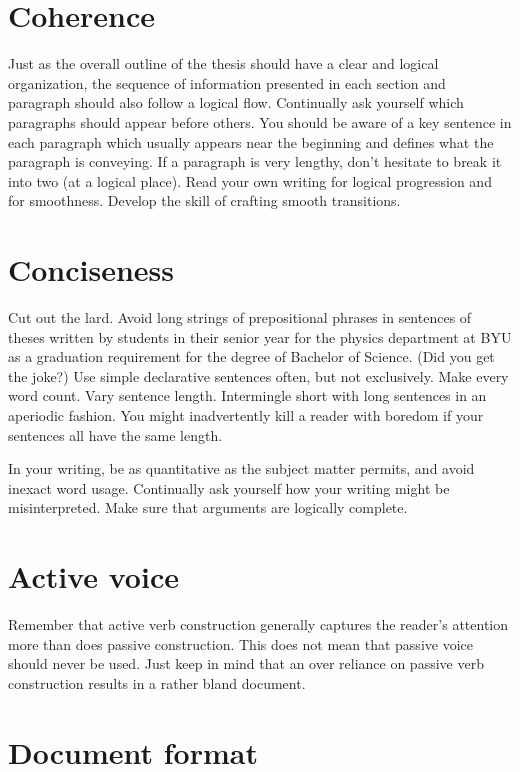 \section{Coherence}
\label{sec:Coherence}

Just as the overall outline of the thesis should have a clear and
logical organization, the sequence of information presented in each
section and paragraph should also follow a logical flow. Continually
ask yourself which paragraphs should appear before others. You
should be aware of a key sentence in each paragraph which usually
appears near the beginning and defines what the paragraph is
conveying. If a paragraph is very lengthy, don't hesitate to break
it into two (at a logical place). Read your own writing for logical
progression and for smoothness. Develop the skill of crafting smooth
transitions.

\section{Conciseness}
\label{sec:Concise}

Cut out the lard. Avoid long strings of prepositional phrases in
sentences of theses written by students in their senior year for the
physics department at BYU as a graduation requirement for the degree
of Bachelor of Science. (Did you get the joke?) Use simple
declarative sentences often, but not exclusively. Make every word
count. Vary sentence length. Intermingle short with long sentences
in an aperiodic fashion. You might inadvertently kill a reader with
boredom if your sentences all have the same length.

In your writing, be as quantitative as the subject matter permits,
and avoid inexact word usage. Continually ask yourself how your
writing might be misinterpreted. Make sure that arguments are
logically complete.

\section{Active voice}
\label{sec:ActiveVoice}

Remember that active verb construction generally captures the
reader's attention more than does passive construction. This does
not mean that passive voice should never be used. Just keep in mind
that an over reliance on passive verb construction results in a
rather bland document.

\section{Document format}
\label{sec:Format} 

